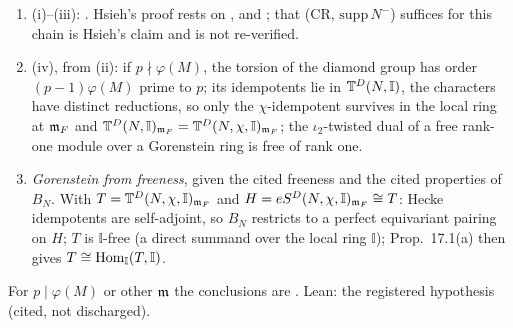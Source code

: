 \begin{outline}
\begin{enumerate}[label=\arabic*.]
\item (i)--(iii): \stcited{} \cite[Thm.~4.5 and its proof, p.~34]{Hs}. Hsieh's proof rests on \cite[Thm.~2.1]{Wi95},
  \cite[Cor.~8.11, Rem.~8.12]{Hel} and \cite[Thm.~6.2, Prop.~6.4, 6.5]{PW}; that (CR, $\mathrm{supp}\,N^-$) suffices for this chain is
  Hsieh's claim and is not re-verified.
\item (iv), \stproved{} from (ii): if $p\nmid\varphi(M)$, the torsion of the diamond group has order $(p-1)\varphi(M)$ prime to $p$; its
  idempotents lie in $\mathbb{T}^D(N,\mathbb I)$, the characters have distinct reductions, so only the $\chi$-idempotent survives in the
  local ring at $\mathfrak{m}_F$ and $\mathbb{T}^D(N,\mathbb I)_{\mathfrak{m}_F}=\mathbb{T}^D(N,\chi,\mathbb I)_{\mathfrak{m}_F}$; the $\iota_2$-twisted dual of a free rank-one
  module over a Gorenstein ring is free of rank one.
\item \emph{Gorenstein from freeness}, \stproved{} given the cited freeness and the cited properties of $B_N$. With
  $T=\mathbb{T}^D(N,\chi,\mathbb I)_{\mathfrak{m}_F}$ and $H=eS^D(N,\chi,\mathbb I)_{\mathfrak{m}_F}\cong T$: Hecke idempotents are self-adjoint, so $B_N$ restricts
  to a perfect equivariant pairing on $H$; $T$ is $\mathbb I$-free (a direct summand over the local ring $\mathbb I$); Prop.~17.1(a)
  then gives $T\cong\operatorname{Hom}_{\mathbb I}(T,\mathbb I)$.
\end{enumerate}
For $p\mid\varphi(M)$ or other $\mathfrak{m}$ the conclusions are \stexp. Lean: the registered hypothesis  (cited, not discharged).
\end{outline}

